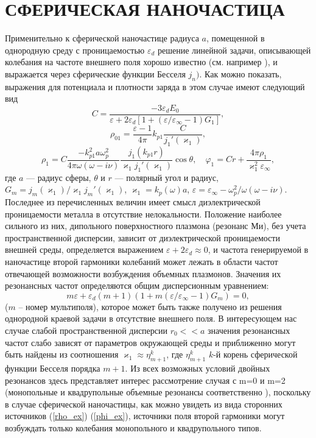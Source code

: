 \documentclass[12pt, a4paper]{article}
\def \eps {\varepsilon}
\def \w {\omega}
\def \ph {\varphi}
\def \kp { \varkappa}
\begin{document}
\section{СФЕРИЧЕСКАЯ НАНОЧАСТИЦА}
Применительно к сферической наночастице радиуса $a$, помещенной в однородную среду с проницаемостью $\eps_d$ решение линейной задачи, описывающей колебания на частоте внешнего поля хорошо известно (см. например \cite{HuaGersten1986}), и выражается через сферические функции Бесселя $j_n)$. Как можно показать, выражения для потенциала и плотности заряда в этом случае имеют следующий вид
\begin{equation} 
	C= \frac{-3\eps_d E_0}{\eps + 2\eps_d [1 + (\eps/\eps_\infty - 1) G_1 ]},  
\end{equation}
\begin{equation} 
\rho_{01} = \frac{\eps -1}{4\pi}k_{p1}\frac{C}{j_1' (\kp_1)}, 	
\end{equation}
\begin{equation} 
	\label{rho_and_phi}
	\rho_1 = C \frac{-k_{p1}^2a\w_p^2}{4\pi\w(\w - i \nu) } \frac{j_1(k_{p1} r)}{\kp_1 j_1' (\kp_1)}\cos\theta, \quad \ph_1 = C r + \frac{4\pi \rho_1 }{\kp_1^2 \eps_\infty},
\end{equation}
где $a$ — радиус сферы, $\theta$ и $r$  — полярный угол и радиус, $G_m ={j_m(\kp_1)}/{\kp_1 j_m'(\kp_1)}$, $\kp_1= k_p(\omega)a$, $\eps = \eps_\infty - {\w_p^2}/{\w(\w - i\nu)}$. Последнее из перечисленных величин имеет смысл диэлектрической проницаемости металла в отсутствие нелокальности. 
Положение наиболее сильного из них, дипольного поверхностного плазмона (резонанс Ми), без учета пространственной дисперсии, зависит от диэлектрической проницаемости внешней среды, определяется выражением $ \eps + 2\eps_d \approx 0$, и частота генерируемой в наночастице второй гармоники колебаний может лежать в области частот отвечающей возможности возбуждения объемных плазмонов. Значения их резонансных частот определяются общим дисперсионным уравнением:
\begin{equation} 	
m \eps + \eps_d(m+1)(1 + m (\eps/\eps_\infty - 1) G_m) = 0,	
\end{equation}
($m$ – номер мультиполя), которое может быть также получено из решения однородной краевой задачи в отсутствие внешнего поля. В интересующем нас случае слабой пространственной дисперсии $r_0 << a$ значения резонансных частот слабо зависят от параметров окружающей среды и приближенно могут быть найдены из соотношения $ \kp_1 \approx \eta_{m+1}^k$, где $\eta_{m+1}^k$ $k$-й корень сферической функции Бесселя порядка $m+1$.	Из всех возможных условий двойных резонансов здесь представляет интерес рассмотрение случая с m=0 и m=2 (монопольные и квадрупольные объемные резонансы соответственно ), поскольку в случае сферической наночастицы, как можно увидеть из вида сторонних источников (\ref{rho_ex}) (\ref{phi_ex}), источники поля второй гармоники могут возбуждать только колебания монопольного и квадрупольного типов. 
\end{document}
